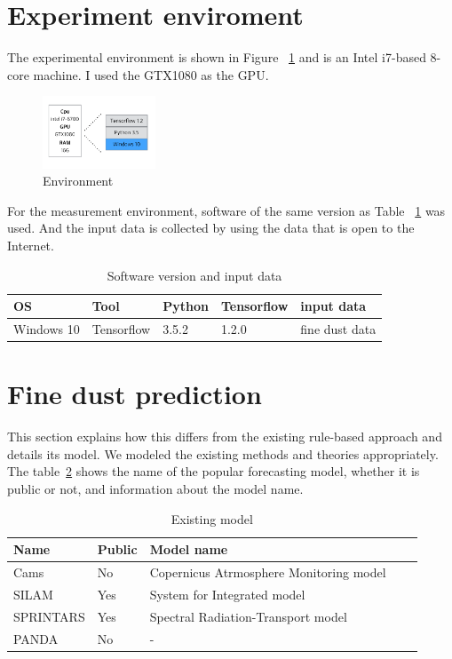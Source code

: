 \documentclass{kcc}
\begin{document}
\section{Experiment enviroment}

The experimental environment is shown in Figure ~\ref{fig:xeon} and is an Intel i7-based 8-core machine. I used the GTX1080 as the GPU.
\begin{figure}[h]
  \begin{center}
     \includegraphics[width=0.3\textwidth]{fig/env.png}
  \end{center}
  \caption{Environment}
  \label{fig:xeon}
\end{figure}

For the measurement environment, software of the same version as Table ~\ref{tab:config} was used.
And the input data is collected by using the data that is open to the Internet.

\begin{table}[h!]
  \caption{Software version and input data}
  \centering
  \small
  \begin{tabular}{l l l l l} \toprule
    OS & Tool & Python & Tensorflow & input data\\
    \midrule
    Windows 10 & Tensorflow & 3.5.2 & 1.2.0 & fine dust data \\
    \bottomrule
  \end{tabular}
  \label{tab:config}
\end{table}

\section{Fine dust prediction}
This section explains how this differs from the existing rule-based approach and details its model. We modeled the existing methods and theories appropriately.
The table~\ref{tab:Company} shows the name of the popular forecasting model, whether it is public or not, and information about the model name.

\begin{table}[h!]
  \caption{Existing model}
  \centering
  \scriptsize 
  \begin{tabular}{l l l l l} \toprule 
    Name & Public & Model name \\
    \midrule
    Cams & No & Copernicus Atrmosphere Monitoring model \\
    \midrule
    SILAM & Yes & System for Integrated model\\
    \midrule
    SPRINTARS & Yes & Spectral Radiation-Transport model\\
    \midrule
    PANDA & No & -\\
    \bottomrule
  \end{tabular}
  \label{tab:Company}
\end{table}
\end{document}

